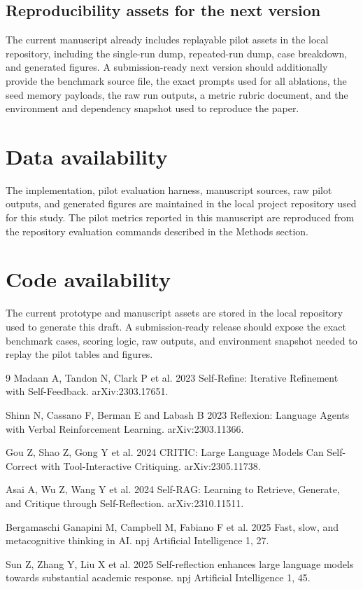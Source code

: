 \documentclass[12pt]{article}
\begin{document}
\subsection{Reproducibility assets for the next version}

The current manuscript already includes replayable pilot assets in the local repository, including the single-run dump, repeated-run dump, case breakdown, and generated figures. A submission-ready next version should additionally provide the benchmark source file, the exact prompts used for all ablations, the seed memory payloads, the raw run outputs, a metric rubric document, and the environment and dependency snapshot used to reproduce the paper.

\section*{Data availability}

The implementation, pilot evaluation harness, manuscript sources, raw pilot outputs, and generated figures are maintained in the local project repository used for this study. The pilot metrics reported in this manuscript are reproduced from the repository evaluation commands described in the Methods section.

\section*{Code availability}

The current prototype and manuscript assets are stored in the local repository used to generate this draft. A submission-ready release should expose the exact benchmark cases, scoring logic, raw outputs, and environment snapshot needed to replay the pilot tables and figures.

\begin{thebibliography}{9}
Madaan A, Tandon N, Clark P et al. 2023 Self-Refine: Iterative Refinement with Self-Feedback. arXiv:2303.17651.

Shinn N, Cassano F, Berman E and Labash B 2023 Reflexion: Language Agents with Verbal Reinforcement Learning. arXiv:2303.11366.

Gou Z, Shao Z, Gong Y et al. 2024 CRITIC: Large Language Models Can Self-Correct with Tool-Interactive Critiquing. arXiv:2305.11738.

Asai A, Wu Z, Wang Y et al. 2024 Self-RAG: Learning to Retrieve, Generate, and Critique through Self-Reflection. arXiv:2310.11511.

Bergamaschi Ganapini M, Campbell M, Fabiano F et al. 2025 Fast, slow, and metacognitive thinking in AI. npj Artificial Intelligence 1, 27.

Sun Z, Zhang Y, Liu X et al. 2025 Self-reflection enhances large language models towards substantial academic response. npj Artificial Intelligence 1, 45.
\end{thebibliography}
\end{document}
